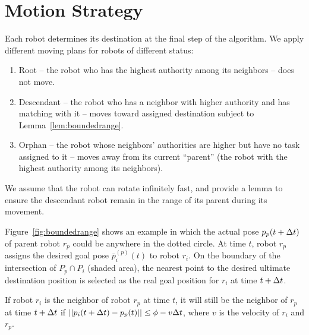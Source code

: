 \section{Motion Strategy}
\label{sec:motion}

Each robot determines its destination at the final step of the algorithm.  
%
We apply different moving plans for robots of different status:
\begin{enumerate}
\item Root -- the robot who has the highest authority among its neighbors -- does not move.
\item Descendant -- the robot who has a neighbor with higher authority and has matching with it -- moves toward assigned destination subject to Lemma~\ref{lem:boundedrange}.
\item Orphan -- the robot whose neighbors' authorities are higher but have no task assigned to it -- moves away from its current ``parent'' (the robot with the highest authority among its neighbors).
\end{enumerate} 


We assume that the robot can rotate infinitely fast, and provide a lemma to ensure the descendant robot remain in the range of its parent during its movement. 

Figure~\ref{fig:boundedrange} shows an example in which the actual
pose $p_p(t+\Delta t)$ of parent robot $r_p$ could be anywhere in the dotted
circle. 
%
At time $t$, robot $r_p$ assigns the desired goal pose $\bar{p}_i^{(p)}(t)$ to robot $r_i$.  
%
On the boundary of the intersection of $P_p \cap P_i$ (shaded area),
the nearest point to the desired ultimate destination position is
selected as the real goal position for $r_i$ at time $t+\Delta t$.

\begin{lem}
  \label{lem:boundedrange}
  If robot $r_i$ is the neighbor of robot $r_p$ at time $t$, it will still be the 
  neighbor of $r_p$ at time $t + \Delta t$ if $|| p_i(t+\Delta t) - p_p(t) || \leq \phi -  v\Delta t$, where $v$ is the velocity of $r_i$ and $r_p$. 
\end{lem}

